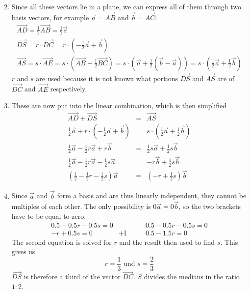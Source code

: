 \documentclass[12pt,eng]{skript_ogg}
\begin{document}
\begin{enumerate}
\setcounter{enumi}{1}
	\item Since all these vectors lie in a plane, we can express all of them through two basis vectors, for example $\vec{a}=\overrightarrow{AB}$ and $\vec{b}=\overrightarrow{AC}$:
	\[\begin{array}{l}
	\overrightarrow{AD}=\frac{1}{2}\overrightarrow{AB}=\frac{1}{2}\vec{a}\\
	\overrightarrow{DS}=r\cdot\overrightarrow{DC}=r\cdot\left(-\frac{1}{2}\vec{a}+\vec{b}\right)\\
	\overrightarrow{AS}=s\cdot\overrightarrow{AE}=s\cdot\left(\overrightarrow{AB}+\frac{1}{2}\overrightarrow{BC}\right)=s\cdot\left(\vec{a}+\frac{1}{2}(\vec{b}-\vec{a})\right)=s\cdot\left(\frac{1}{2}\vec{a}+\frac{1}{2}\vec{b}\right)
	\end{array}\]
	$r$ and $s$ are used because it is not known what portions $\overrightarrow{DS}$ and $\overrightarrow{AS}$ are of $\overrightarrow{DC}$ and $\overrightarrow{AE}$ respectively.
	\item These are now put into the linear combination, which is then simplified
	\begin{eqnarray*}
	\overrightarrow{AD}+\overrightarrow{DS} & = & \overrightarrow{AS}\\
	\frac{1}{2}\vec{a}+r\cdot\left(-\frac{1}{2}\vec{a}+\vec{b}\right) & = & s\cdot\left(\frac{1}{2}\vec{a}+\frac{1}{2}\vec{b}\right)\\
	\frac{1}{2}\vec{a}-\frac{1}{2}r\vec{a}+r\vec{b} & = & \frac{1}{2}s\vec{a}+\frac{1}{2}s\vec{b}\\
	\frac{1}{2}\vec{a}-\frac{1}{2}r\vec{a}-\frac{1}{2}s\vec{a} & = & -r\vec{b}+\frac{1}{2}s\vec{b}\\
	\left(\frac{1}{2}-\frac{1}{2}r-\frac{1}{2}s\right)\vec{a} & = & \left(-r+\frac{1}{2}s\right)\vec{b}
	\end{eqnarray*}
	\item Since $\vec{a}$ and $\vec{b}$ form a basis and are thus linearly independent, they cannot be multiples of each other. The only possibility is $0\vec{a}=0\vec{b}$, so the two brackets have to be equal to zero.
	\[\begin{array}{r|l}
	0.5-0.5r-0.5s=0 & \\
	-r+0.5s=0 & +\mbox{I}
	\end{array}\qquad\begin{array}{r}
	0.5-0.5r-0.5s=0 \\
	0.5-1.5r=0
	\end{array}\]
	The second equation is solved for $r$ and the result then used to find $s$. This gives us
	\[r=\frac{1}{3}\mbox{ und }s=\frac{2}{3}\]
	$\overrightarrow{DS}$ is therefore a third of the vector $\overrightarrow{DC}$. $S$ divides the medians in the ratio $1:2$.
\end{enumerate}
\end{document}
